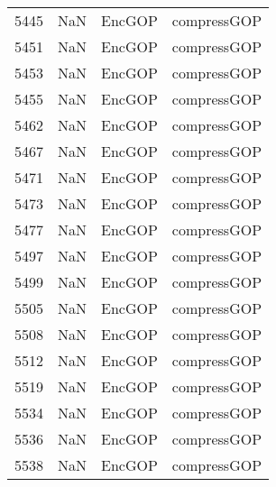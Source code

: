 \begin{tabular}{llll}
5445 &                   NaN &                     EncGOP &                               compressGOP \\
5451 &                   NaN &                     EncGOP &                               compressGOP \\
5453 &                   NaN &                     EncGOP &                               compressGOP \\
5455 &                   NaN &                     EncGOP &                               compressGOP \\
5462 &                   NaN &                     EncGOP &                               compressGOP \\
5467 &                   NaN &                     EncGOP &                               compressGOP \\
5471 &                   NaN &                     EncGOP &                               compressGOP \\
5473 &                   NaN &                     EncGOP &                               compressGOP \\
5477 &                   NaN &                     EncGOP &                               compressGOP \\
5497 &                   NaN &                     EncGOP &                               compressGOP \\
5499 &                   NaN &                     EncGOP &                               compressGOP \\
5505 &                   NaN &                     EncGOP &                               compressGOP \\
5508 &                   NaN &                     EncGOP &                               compressGOP \\
5512 &                   NaN &                     EncGOP &                               compressGOP \\
5519 &                   NaN &                     EncGOP &                               compressGOP \\
5534 &                   NaN &                     EncGOP &                               compressGOP \\
5536 &                   NaN &                     EncGOP &                               compressGOP \\
5538 &                   NaN &                     EncGOP &                               compressGOP \\

\end{tabular}
